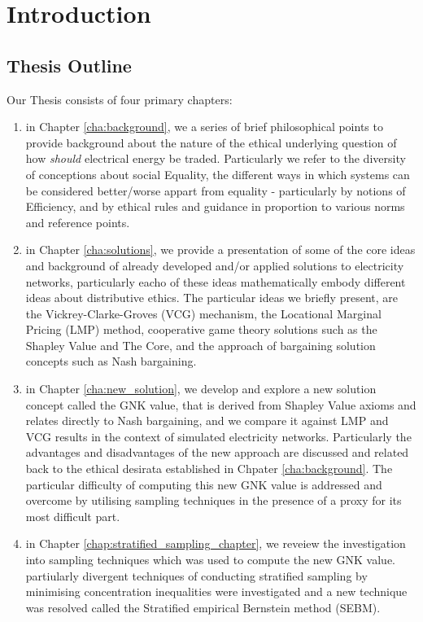 \chapter{Introduction}
\label{cha:intro}



\section*{Thesis Outline}
Our Thesis consists of four primary chapters:
\begin{enumerate}
\item in Chapter \ref{cha:background}, we a series of brief philosophical points to provide background about the nature of the ethical underlying question of how \textit{should} electrical energy be traded. Particularly we refer to the diversity of conceptions about social Equality, the different ways in which systems can be considered better/worse appart from equality - particularly by notions of Efficiency, and by ethical rules and guidance in proportion to various norms and reference points. 
\item in Chapter \ref{cha:solutions}, we provide a presentation of some of the core ideas and background of already developed and/or applied solutions to electricity networks, particularly eacho of these ideas mathematically embody different ideas about distributive ethics. The particular ideas we briefly present, are the Vickrey-Clarke-Groves (VCG) mechanism, the Locational Marginal Pricing (LMP) method, cooperative game theory solutions such as the Shapley Value and The Core, and the approach of bargaining solution concepts such as Nash bargaining. 
\item in Chapter \ref{cha:new_solution}, we develop and explore a new solution concept called the GNK value, that is derived from Shapley Value axioms and relates directly to Nash bargaining, and we compare it against LMP and VCG results in the context of simulated electricity networks. Particularly the advantages and disadvantages of the new approach are discussed and related back to the ethical desirata established in Chpater \ref{cha:background}. The particular difficulty of computing this new GNK value is addressed and overcome by utilising sampling techniques in the presence of a proxy for its most difficult part.
\item in Chapter \ref{chap:stratified_sampling_chapter}, we reveiew the investigation into sampling techniques which was used to compute the new GNK value. partiularly divergent techniques of conducting stratified sampling by minimising concentration inequalities were investigated and a new technique was resolved called the Stratified empirical Bernstein method (SEBM).
\end{enumerate}

